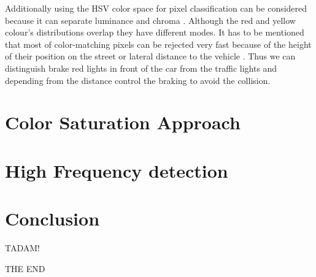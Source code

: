 \documentclass[letterpaper, 10 pt, conference]{ieeeconf} %
\begin{document}
Additionally using the HSV color space for pixel classification can be considered because it can separate luminance and chroma \cite{c4}. Although the red and yellow colour's distributions overlap they have different modes. It has to be mentioned that most of color-matching pixels can be rejected very fast because of the height of their position on the street or lateral distance to the vehicle \cite{c4}. Thus we can distinguish brake red lights in front of the car from the traffic lights and depending from the distance control the braking to avoid the collision.

\section{Color Saturation Approach}


\section{High Frequency detection}


\section{Conclusion}
TADAM! 

THE END


\addtolength{\textheight}{-12cm} %


\end{document}
